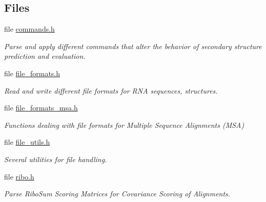 \subsection*{Files}
\begin{DoxyCompactItemize}
\item 
file \hyperlink{commands_8h}{commands.\+h}
\begin{DoxyCompactList}\small\item\em Parse and apply different commands that alter the behavior of secondary structure prediction and evaluation. \end{DoxyCompactList}\item 
file \hyperlink{file__formats_8h}{file\+\_\+formats.\+h}
\begin{DoxyCompactList}\small\item\em Read and write different file formats for R\+NA sequences, structures. \end{DoxyCompactList}\item 
file \hyperlink{file__formats__msa_8h}{file\+\_\+formats\+\_\+msa.\+h}
\begin{DoxyCompactList}\small\item\em Functions dealing with file formats for Multiple Sequence Alignments (M\+SA) \end{DoxyCompactList}\item 
file \hyperlink{file__utils_8h}{file\+\_\+utils.\+h}
\begin{DoxyCompactList}\small\item\em Several utilities for file handling. \end{DoxyCompactList}\item 
file \hyperlink{ribo_8h}{ribo.\+h}
\begin{DoxyCompactList}\small\item\em Parse Ribo\+Sum Scoring Matrices for Covariance Scoring of Alignments. \end{DoxyCompactList}\end{DoxyCompactItemize}
